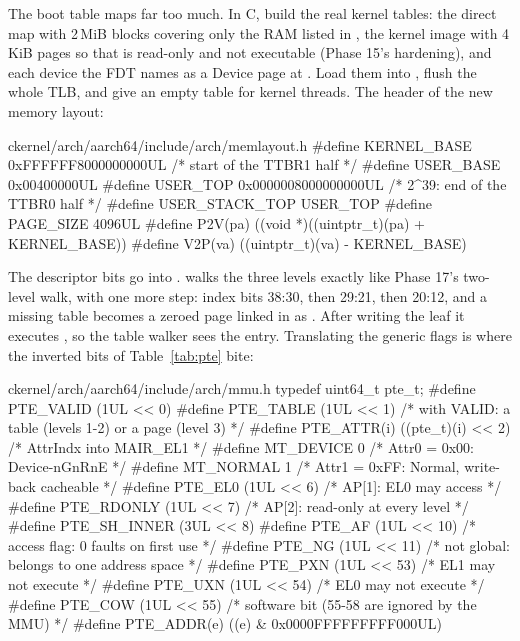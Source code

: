 \documentclass[11pt,a4paper]{article}
\begin{document}
The boot table maps far too much. In C, build the real kernel tables: the direct map with 2\,MiB blocks covering only
the RAM listed in , the kernel image with 4\,KiB pages so that  is read-only and
 not executable (Phase 15's hardening), and each device the FDT names as a Device page at
. Load them into , flush the whole TLB, and give  an empty table for
kernel threads. The header of the new memory layout:

\begin{lst}{c}{kernel/arch/aarch64/include/arch/memlayout.h}
#define KERNEL_BASE     0xFFFFFF8000000000UL    /* start of the TTBR1 half */
#define USER_BASE       0x00400000UL
#define USER_TOP        0x0000008000000000UL    /* 2^39: end of the TTBR0 half */
#define USER_STACK_TOP  USER_TOP
#define PAGE_SIZE       4096UL
#define P2V(pa)         ((void *)((uintptr_t)(pa) + KERNEL_BASE))
#define V2P(va)         ((uintptr_t)(va) - KERNEL_BASE)
\end{lst}

The descriptor bits go into .  walks the three levels exactly like Phase 17's
two-level walk, with one more step: index bits 38:30, then 29:21, then 20:12, and a missing table becomes a zeroed
page linked in as . After writing the leaf it executes , so the
table walker sees the entry. Translating the generic  flags is where the inverted bits of
Table~\ref{tab:pte} bite:

\begin{lst}{c}{kernel/arch/aarch64/include/arch/mmu.h}
typedef uint64_t pte_t;
#define PTE_VALID    (1UL << 0)
#define PTE_TABLE    (1UL << 1)         /* with VALID: a table (levels 1-2) or a page (level 3) */
#define PTE_ATTR(i)  ((pte_t)(i) << 2)  /* AttrIndx into MAIR_EL1 */
#define MT_DEVICE    0                  /* Attr0 = 0x00: Device-nGnRnE */
#define MT_NORMAL    1                  /* Attr1 = 0xFF: Normal, write-back cacheable */
#define PTE_EL0      (1UL << 6)         /* AP[1]: EL0 may access */
#define PTE_RDONLY   (1UL << 7)         /* AP[2]: read-only at every level */
#define PTE_SH_INNER (3UL << 8)
#define PTE_AF       (1UL << 10)        /* access flag: 0 faults on first use */
#define PTE_NG       (1UL << 11)        /* not global: belongs to one address space */
#define PTE_PXN      (1UL << 53)        /* EL1 may not execute */
#define PTE_UXN      (1UL << 54)        /* EL0 may not execute */
#define PTE_COW      (1UL << 55)        /* software bit (55-58 are ignored by the MMU) */
#define PTE_ADDR(e)  ((e) & 0x0000FFFFFFFFF000UL)
\end{lst}
\end{document}
